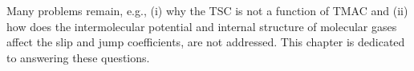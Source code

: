 Many problems remain, e.g., (i) why the TSC is not a function of TMAC and (ii) how does the intermolecular potential and internal structure of molecular gases affect the slip and jump coefficients, are not addressed. This chapter is dedicated to answering these questions. 





%
%



